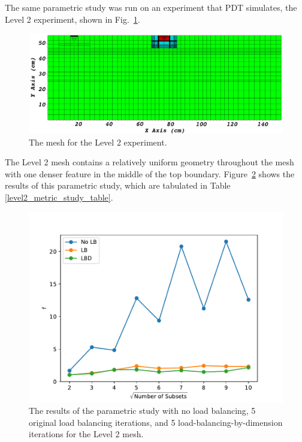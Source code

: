 The same parametric study was run on an experiment that PDT simulates, the Level 2 experiment, shown in Fig.~\ref{level2_nocut_lbchapter}.
\begin{figure}[ht]
\centering
\includegraphics[scale=0.3]{../../figures/level2_nocut.png}
\caption{The mesh for the Level 2 experiment.}
\label{level2_nocut_lbchapter}
\end{figure}
The Level 2 mesh contains a relatively uniform geometry throughout the mesh with one denser feature in the middle of the top boundary.
Figure~\ref{level2_metric_study} shows the results of this parametric study, which are tabulated in Table \ref{level2_metric_study_table}.
\begin{figure}[H]
\centering
\includegraphics[scale=0.7]{../figures/level2_metric_study.pdf}
\caption{The results of the parametric study with no load balancing, 5 original load balancing iterations, and 5 load-balancing-by-dimension iterations for the Level 2 mesh.}
\label{level2_metric_study}
\end{figure}
